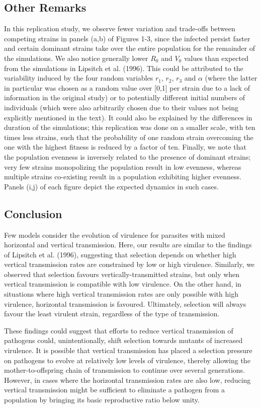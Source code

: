 \subsection{Other Remarks}
In this replication study, we observe fewer variation and trade-offs between competing strains in panels (a,b) of Figures 1-3, since the infected persist faster and certain dominant strains take over the entire population for the remainder of the simulations. We also notice generally lower $R_0$ and $V_0$ values than expected from the simulations in Lipsitch et al. (1996)\supercite{Lipsitch:1996}. This could be attributed to the variability induced by the four random variables $r_1$, $r_2$, $r_3$ and $\alpha$ (where the latter in particular was chosen as a random value over [0,1] per strain due to a lack of information in the original study) or to potentially different initial numbers of individuals (which were also arbitrarily chosen due to their values not being explicitly mentioned in the text). It could also be explained by the differences in duration of the simulations; this replication was done on a smaller scale, with ten times less strains, such that the probability of one random strain overcoming the one with the highest fitness is reduced by a factor of ten. Finally, we note that the population evenness is inversely related to the presence of dominant strains; very few strains monopolizing the population result in low evenness, whereas multiple strains co-existing result in a population exhibiting higher evenness. Panels (i,j) of each figure depict the expected dynamics in such cases.

\subsection{Conclusion}
Few models consider the evolution of virulence for parasites with mixed horizontal and vertical transmission. Here, our results are similar to the findings of Lipsitch et al. (1996)\supercite{Lipsitch:1996}, suggesting that selection depends on whether high vertical transmission rates are constrained by low or high virulence. Similarly, we observed that selection favours vertically-transmitted strains, but only when vertical transmission is compatible with low virulence. On the other hand, in situations where high vertical transmission rates are only possible with high virulence, horizontal transmission is favoured. Ultimately, selection will always favour the least virulent strain, regardless of the type of transmission. 
	
These findings could suggest that efforts to reduce vertical transmission of pathogens could, unintentionally, shift selection towards mutants of increased virulence. It is possible that vertical transmission has placed a selection pressure on pathogens to evolve at relatively low levels of virulence, thereby allowing the mother-to-offspring chain of transmission to continue over several generations. However, in cases where the horizontal transmission rates are also low, reducing vertical transmission might be sufficient to eliminate a pathogen from a population by bringing its basic reproductive ratio below unity.

